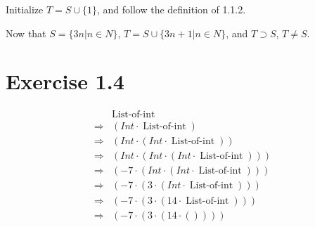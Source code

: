 \documentclass[11pt,a4paper]{article}
\DeclareMathOperator{\listofint}{List-of-int}
\begin{document}
Initialize $T = S \cup \{1\}$, and follow the definition of 1.1.2.

Now that
$S  = \{ 3n | n \in N \}$,
$T = S \cup \{3n+1 | n \in N\}$,
and $T \supset S$,  $ T \neq S $.

\section{Exercise 1.4}

\begin{align*}
    & \listofint \\
    \Rightarrow & (Int \cdot \listofint) \\
    \Rightarrow & (Int \cdot (Int \cdot \listofint)) \\
    \Rightarrow & (Int \cdot (Int \cdot (Int \cdot \listofint))) \\
    \Rightarrow & ( -7 \cdot (Int \cdot (Int \cdot \listofint))) \\
    \Rightarrow & ( -7 \cdot (  3 \cdot (Int \cdot \listofint))) \\
    \Rightarrow & ( -7 \cdot (  3 \cdot ( 14 \cdot \listofint))) \\
    \Rightarrow & ( -7 \cdot (  3 \cdot ( 14 \cdot         ())))
\end{align*}
\end{document}
